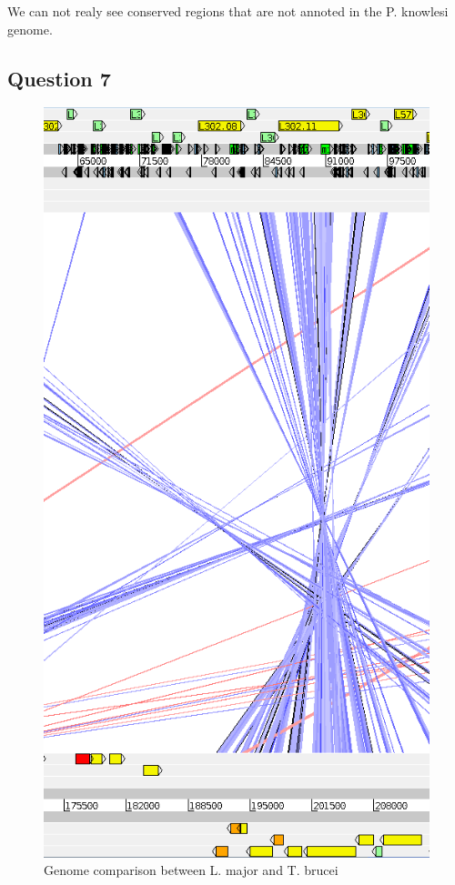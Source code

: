 \documentclass[]{article}
\theoremstyle{definition}
\begin{document}
We can not realy see conserved regions that are not annoted in the P.
knowlesi genome.

\subsection{Question 7}

 \begin{figure}[H]
	\centering
	\includegraphics*[scale=0.3]{image/q7.png}
	\caption{ Genome comparison between L. major and T. brucei }
\end{figure}
\end{document}
